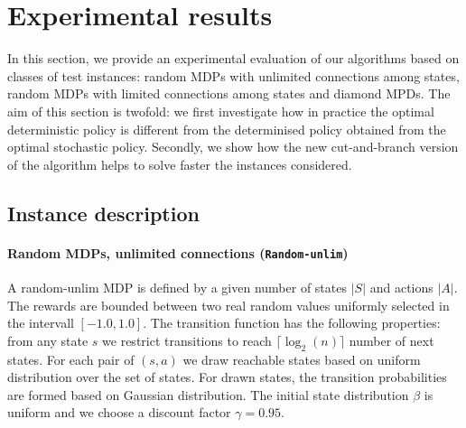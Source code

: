 \section{Experimental results}\label{sec:experiments}

In this section, we provide an experimental evaluation of our algorithms based on  classes of test instances: %
random MDPs with unlimited connections among states, random MDPs with limited connections among states and diamond MPDs.  
The aim of this section is twofold: we first investigate how in practice the optimal deterministic policy is different from the determinised policy obtained from the optimal stochastic policy. Secondly, we show how the new cut-and-branch version of the algorithm helps to solve faster the instances considered.




\subsection{Instance description}
\paragraph{Random MDPs, unlimited connections (\texttt{Random-unlim})}
A random-unlim MDP is defined by a given number of states $|S|$ and actions $|A|$. The rewards are bounded between two real random values uniformly selected in the intervall $[-1.0,1.0]$. 
The transition function has the following properties: from any state $s$ we restrict transitions to reach $\lceil \log_2(n) \rceil$ number of next states. 
For each pair of $(s, a)$ we draw reachable states based on uniform distribution over the set of states. For drawn states, the transition probabilities are formed based on Gaussian distribution. The initial state distribution $\beta$ is uniform and we choose a discount factor $\gamma = 0.95$. 
